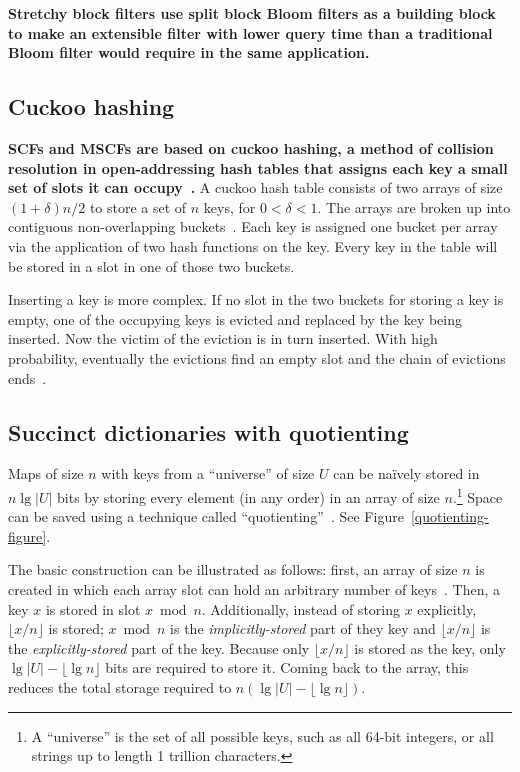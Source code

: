 \documentclass[letterpaper,twocolumn,10pt]{article}
\newcommand{\Taffy}{Stretchy}
\newcommand{\TCF}{SCF}
\newcommand{\MTCF}{MSCF}
\newcommand{\Taffy}{Taffy}
\newcommand{\TCF}{TCF}
\newcommand{\MTCF}{MTCF}
\begin{document}
{\bf \Taffy{} block filters use split block Bloom filters as a building block to make an extensible filter with lower query time than a traditional Bloom filter would require in the same application.}

\subsection{Cuckoo hashing}

{\bf \TCF{}s and \MTCF{}s are based on cuckoo hashing, a method of collision resolution in open-address\-ing hash tables that assigns each key a small set of slots it can occupy~\cite{cuckoo-journal}.}
A cuckoo hash table consists of two arrays of size $(1 + \delta)n/2$ to store a set of $n$ keys, for $0 < \delta < 1$.
The arrays are broken up into contiguous non-overlapping buckets~\cite{buckets,load-thresholds}.
Each key is assigned one bucket per array via the application of two hash functions on the key.
Every key in the table will be stored in a slot in one of those two buckets.

Inserting a key is more complex.
If no slot in the two buckets for storing a key is empty, one of the occupying keys is evicted and replaced by the key being inserted.
Now the victim of the eviction is in turn inserted.
With high probability, eventually the evictions find an empty slot and the chain of evictions ends~\cite{cuckoo-journal}.

\subsection{Succinct dictionaries with quotienting}
\label{quotienting}

Maps of size $n$ with keys from a ``universe'' of size $U$ can be na\"ively stored in $n \lg |U|$ bits by storing every element (in any order) in an array of size $n$.\footnote{A ``universe'' is the set of all possible keys, such as all 64-bit integers, or all strings up to length 1 trillion characters.}
Space can be saved using a technique called ``quotienting''~\cite{knuth,quotient-filter}.
See Figure~\ref{quotienting-figure}.

The basic construction can be illustrated as follows:
first, an array of size $n$ is created in which each array slot can hold an arbitrary number of keys~\cite{raman-practical}.
Then, a key $x$ is stored in slot $x \bmod n$.
Additionally, instead of storing $x$ explicitly, $\lfloor x / n \rfloor$ is stored;
$x \bmod n$ is the {\em implicitly-stored} part of they key and $\lfloor x / n \rfloor$ is the {\em explicitly-stored} part of the key.
Because only $\lfloor x / n \rfloor$ is stored as the key, only $\lg |U| - \lfloor \lg n \rfloor$ bits are required to store it.
Coming back to the array, this reduces the total storage required to $n (\lg |U| - \lfloor \lg n \rfloor)$.
\end{document}
